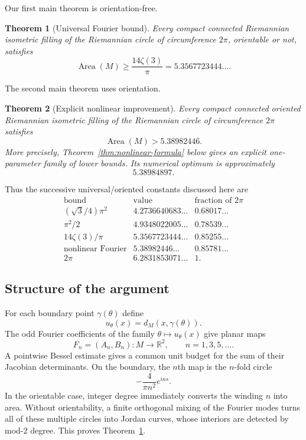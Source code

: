 \documentclass[11pt]{article}
\newtheorem{theorem}{Theorem}[section]
\newcommand{\Area}{\operatorname{Area}}
\newcommand{\R}{\mathbb R}
\begin{document}
Our first main theorem is orientation-free.

\begin{theorem}[Universal Fourier bound]\label{thm:universal}
Every compact connected Riemannian isometric filling of the Riemannian
circle of circumference $2\pi$, orientable or not, satisfies
\[
        \boxed{\Area(M)\ge\frac{14\zeta(3)}{\pi}}
        =5.3567723444\ldots .
\]
\end{theorem}

The second main theorem uses orientation.

\begin{theorem}[Explicit nonlinear improvement]\label{thm:nonlinear-main}
Every compact connected \emph{oriented} Riemannian isometric filling of
the Riemannian circle of circumference $2\pi$ satisfies
\[
        \boxed{\Area(M)>5.38982446}.
\]
More precisely, Theorem~\ref{thm:nonlinear-formula} below gives an explicit
one-parameter family of lower bounds.  Its numerical optimum is
approximately
\[
        5.38984897.
\]
\end{theorem}

Thus the successive universal/oriented constants discussed here are
\[
\begin{array}{c|c|c}
\text{bound}&\text{value}&\text{fraction of }2\pi\\ \hline
(\sqrt3/4)\pi^2
&4.2736640683\ldots&0.68017\ldots\\
\pi^2/2
&4.9348022005\ldots&0.78539\ldots\\
14\zeta(3)/\pi
&5.3567723444\ldots&0.85255\ldots\\
\text{nonlinear Fourier}
&5.38982446\ldots&0.85781\ldots\\
2\pi
&6.2831853071\ldots&1.
\end{array}
\]

\subsection*{Structure of the argument}

For each boundary point $\gamma(\theta)$ define
\[
        u_\theta(x)=d_M(x,\gamma(\theta)).
\]
The odd Fourier coefficients of the family $\theta\mapsto u_\theta(x)$
give planar maps
\[
        F_n=(A_n,B_n):M\to\R^2,\qquad n=1,3,5,\ldots.
\]
A pointwise Bessel estimate gives a common unit budget for the sum of their
Jacobian determinants.  On the boundary, the $n$th map is the $n$-fold
circle
\[
        -\frac4{\pi n^2}e^{ins}.
\]
In the orientable case, integer degree immediately converts the winding
$n$ into area.  Without orientability, a finite orthogonal mixing of the
Fourier modes turns all of these multiple circles into Jordan curves, whose
interiors are detected by mod-$2$ degree.  This proves
Theorem~\ref{thm:universal}.
\end{document}
